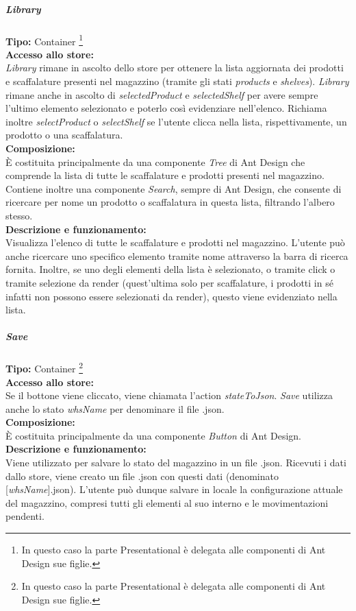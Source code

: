 \subparagraph{\colorbox{verde_uml}{Library}}
\textbf{Tipo:} Container \footnote[7]{In questo caso la parte Presentational è delegata alle componenti di Ant Design sue figlie.}\\
\textbf{Accesso allo store:} \\
\textit{Library} rimane in ascolto dello store per ottenere la lista aggiornata dei prodotti e scaffalature presenti nel magazzino (tramite gli stati \textit{products} e \textit{shelves}). \textit{Library} rimane anche in ascolto di \textit{selectedProduct} e \textit{selectedShelf} per avere sempre l'ultimo elemento selezionato e poterlo così evidenziare nell'elenco. Richiama inoltre \textit{selectProduct} o \textit{selectShelf} se l'utente clicca nella lista, rispettivamente, un prodotto o una scaffalatura. \\
\textbf{Composizione:} \\
È costituita principalmente da una componente \textit{Tree} di Ant Design che comprende la lista di tutte le scaffalature e prodotti presenti nel magazzino. Contiene inoltre una componente \textit{Search}, sempre di Ant Design, che consente di ricercare per nome un prodotto o scaffalatura in questa lista, filtrando l'albero stesso. \\
\textbf{Descrizione e funzionamento:} \\
Visualizza l'elenco di tutte le scaffalature e prodotti nel magazzino. L'utente può anche ricercare uno specifico elemento tramite nome attraverso la barra di ricerca fornita. Inoltre, se uno degli elementi della lista è selezionato, o tramite click o tramite selezione da render (quest'ultima solo per scaffalature, i prodotti in sé infatti non possono essere selezionati da render), questo viene evidenziato nella lista.

\subparagraph{\colorbox{verde_uml}{Save}}
\textbf{Tipo:} Container \footnote[7]{In questo caso la parte Presentational è delegata alle componenti di Ant Design sue figlie.}\\
\textbf{Accesso allo store:} \\
Se il bottone viene cliccato, viene chiamata l'action \textit{stateToJson}. \textit{Save} utilizza anche lo stato \textit{whsName} per denominare il file .json.\\
\textbf{Composizione:} \\
È costituita principalmente da una componente \textit{Button} di Ant Design. \\
\textbf{Descrizione e funzionamento:} \\
Viene utilizzato per salvare lo stato del magazzino in un file .json. Ricevuti i dati dallo store, viene creato un file .json con questi dati (denominato [\textit{whsName}].json). L'utente può dunque salvare in locale la configurazione attuale del magazzino, compresi tutti gli elementi al suo interno e le movimentazioni pendenti.

